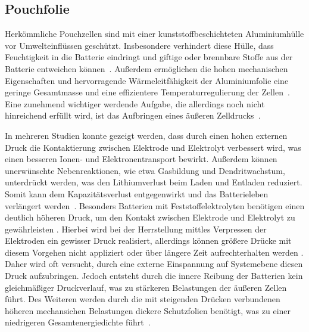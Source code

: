 \subsection{Pouchfolie}
Herkömmliche Pouchzellen sind mit einer kunststoffbeschichteten Aluminiumhülle vor Umwelteinflüssen geschützt. Insbesondere verhindert diese Hülle, dass Feuchtigkeit in die Batterie eindringt und giftige oder brennbare Stoffe aus der Batterie entweichen können~\cite{Beard2019}. Außerdem ermöglichen die hohen mechanischen Eigenschaften und hervorragende Wärmeleitfähigkeit der Aluminiumfolie eine geringe Gesamtmasse und eine effizientere Temperaturregulierung der Zellen~\cite{Boaretto2021}. Eine zunehmend wichtiger werdende Aufgabe, die allerdings noch nicht hinreichend erfüllt wird, ist das Aufbringen eines äußeren Zelldrucks~\cite{Sakamoto2019}.

In mehreren Studien konnte gezeigt werden, dass durch einen hohen externen Druck die Kontaktierung zwischen Elektrode und Elektrolyt verbessert wird, was einen besseren Ionen- und Elektronentransport bewirkt. Außerdem können unerwünschte Nebenreaktionen, wie etwa Gasbildung und Dendritwachstum,  unterdrückt werden, was den Lithiumverlust beim Laden und Entladen reduziert. Somit kann dem Kapazitätsverlust entgegenwirkt und das Batterieleben verlängert werden~\cite{Mussa2018,Mueller2019,Sakamoto2019}. Besonders Batterien mit Feststoffelektrolyten benötigen einen deutlich höheren Druck, um den Kontakt zwischen Elektrode und Elektrolyt zu gewährleisten \cite{Boaretto2021}. Hierbei wird bei der Herrstellung mittles Verpressen der Elektroden ein gewisser Druck realisiert, allerdings können größere Drücke mit diesem Vorgehen nicht appliziert oder über längere Zeit aufrechterhalten werden \cite{Garayt2023}. Daher wird oft versucht, durch eine externe Einspannung auf Systemebene diesen Druck aufzubringen. Jedoch entsteht durch die innere Reibung der Batterien kein gleichmäßiger Druckverlauf, was zu stärkeren Belastungen der äußeren Zellen führt. Des Weiteren werden durch die mit steigenden Drücken verbundenen höheren mechansichen Belastungen  dickere Schutzfolien benötigt, was zu einer niedrigeren Gesamtenergiedichte führt~\cite{Ye2024,Asp2021}.


